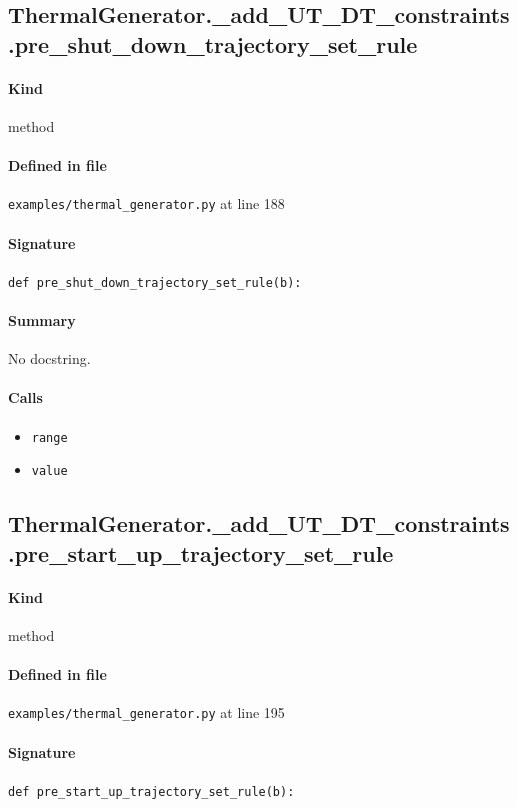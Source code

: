\documentclass[11pt]{report}
\begin{document}
\subsection{ThermalGenerator.\_add\_UT\_DT\_constraints.pre\_shut\_down\_trajectory\_set\_rule}
\label{def:examples-thermal_generator.py:ThermalGenerator._add_UT_DT_constraints.pre_shut_down_trajectory_set_rule:L188}
\paragraph{Kind} method
\paragraph{Defined in file} \texttt{examples/thermal\_generator.py} at line 188
\paragraph{Signature} \texttt{def pre\_shut\_down\_trajectory\_set\_rule(b):}
\paragraph{Summary} No docstring.
\paragraph{Calls}
\begin{itemize}[leftmargin=*]
  \item \texttt{range}
  \item \texttt{value}
\end{itemize}
\subsection{ThermalGenerator.\_add\_UT\_DT\_constraints.pre\_start\_up\_trajectory\_set\_rule}
\label{def:examples-thermal_generator.py:ThermalGenerator._add_UT_DT_constraints.pre_start_up_trajectory_set_rule:L195}
\paragraph{Kind} method
\paragraph{Defined in file} \texttt{examples/thermal\_generator.py} at line 195
\paragraph{Signature} \texttt{def pre\_start\_up\_trajectory\_set\_rule(b):}
\end{document}
